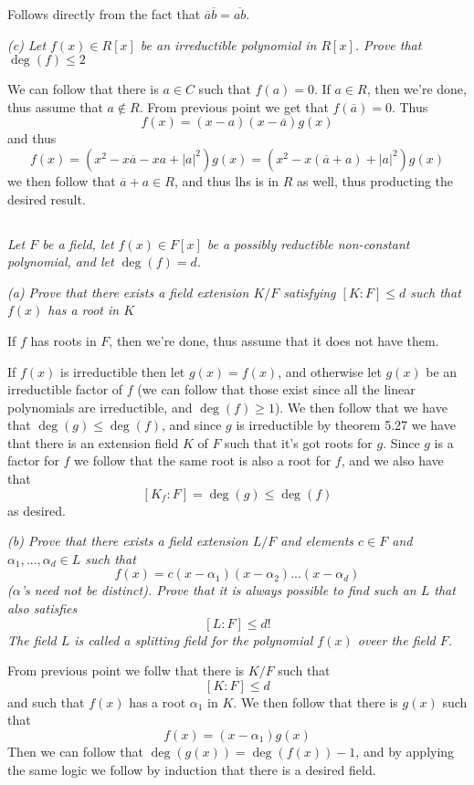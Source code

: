 \documentclass[11pt,oneside,titlepage]{book}
\begin{document}
Follows directly from the fact that $\overline{a}\overline{b} =
\overline{ab}$.

\textit{(c) Let $f(x) \in R[x]$ be an irreductible polynomial in
$R[x]$. Prove that $\deg(f) \leq 2$}

We can follow that there is $a \in C$ such that $f(a) = 0$. If $a \in
R$, then we're done, thus assume that $a \notin R$. From previous
point we get that $f(\overline{a}) = 0$. Thus
$$f(x) = (x - a)(x - \overline{a})g(x)$$
and thus
$$f(x) = (x^2 - x\overline{a} - xa + |a|^2)g(x) = (x^2 - x(\overline{a} + a) + |a|^2)g(x)$$
we then follow that $\overline{a} + a \in R$, and thus lhs is in $R$
as well, thus producting the desired result.

\subsection{}

\textit{Let $F$ be a field, let $f(x) \in F[x]$ be a possibly
reductible non-constant polynomial, and let $\deg(f) = d$. }

\textit{(a) Prove that there exists a field extension $K/F$ satisfying
$[K:F] \leq d$ such that $f(x)$ has a root in $K$}

If $f$ has roots in $F$, then we're done, thus assume that it does not
have them.

If $f(x)$ is irreductible then let $g(x) = f(x)$, and otherwise let
$g(x)$ be an irreductible factor of $f$ (we can follow that those
exist since all the linear polynomials are irreductible, and $\deg(f)
\geq 1$). We then follow that we have that $\deg(g) \leq \deg(f)$, and
since $g$ is irreductible by theorem 5.27 we have that there is an
extension field $K$ of $F$ such that it's got roots for $g$. Since $g$
is a factor for $f$ we follow that the same root is also a root for
$f$, and we also have that
$$[K_f:F] = \deg(g) \leq \deg(f)$$
as desired.

\textit{(b) Prove that there exists a field extension $L/F$ and
elements $c \in F$ and $\alpha_1, ..., \alpha_d \in L$ such that
  $$f(x) = c(x - \alpha_1)(x - \alpha_2)...(x - \alpha_d)$$
  ($\alpha$'s need not be distinct). Prove that it is always possible
to find such an $L$ that also satisfies
  $$[L:F] \leq d!$$
  The field $L$ is called a splitting field for the polynomial $f(x)$
oveer the field $F$.  }

From previous point we follw that there is $K/F$ such that
$$[K:F] \leq d$$
and such that $f(x)$ has a root $\alpha_1$ in $K$. We then follow that
there is $g(x)$ such that
$$f(x) = (x - \alpha_1)g(x)$$
Then we can follow that $\deg(g(x)) = \deg(f(x)) - 1$, and by applying
the same logic we follow by induction that there is a desired field.
\end{document}
